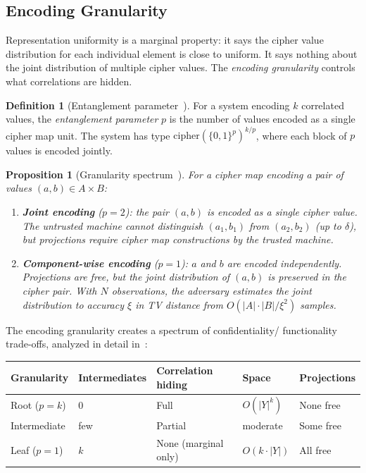 \documentclass[11pt]{article}
\theoremstyle{definition}
\newtheorem{definition}{Definition}[section]
\theoremstyle{plain}
\newtheorem{proposition}[theorem]{Proposition}
\theoremstyle{remark}
\newcommand{\B}{\{0,1\}}
\begin{document}
\subsection{Encoding Granularity}
\label{subsec:granularity}

Representation uniformity is a marginal property: it says the cipher
value distribution for each individual element is close to uniform.  It
says nothing about the joint distribution of multiple cipher
values.  The \emph{encoding granularity} controls what correlations are
hidden.

\begin{definition}[Entanglement parameter~{\cite[Sec.~8]{towell2026cipher}}]
For a system encoding $k$ correlated values, the \emph{entanglement
parameter} $p$ is the number of values encoded as a single cipher map
unit.  The system has type $\mathrm{cipher}(\B^p)^{k/p}$, where each
block of $p$ values is encoded jointly.
\end{definition}

\begin{proposition}[Granularity spectrum~{\cite[Prop.~8.1]{towell2026cipher}}]
\label{prop:granularity}
For a cipher map encoding a pair of values $(a, b) \in A \times B$:
\begin{enumerate}
\item \textbf{Joint encoding} ($p = 2$): the pair $(a, b)$ is encoded as
  a single cipher value.  The untrusted machine cannot distinguish
  $(a_1, b_1)$ from $(a_2, b_2)$ (up to $\delta$), but projections
  require cipher map constructions by the trusted machine.

\item \textbf{Component-wise encoding} ($p = 1$): $a$ and $b$ are
  encoded independently.  Projections are free, but the joint distribution
  of $(a, b)$ is preserved in the cipher pair.  With $N$ observations, the
  adversary estimates the joint distribution to accuracy $\xi$ in TV
  distance from $O(|A| \cdot |B| / \xi^2)$ samples.
\end{enumerate}
\end{proposition}

The encoding granularity creates a spectrum of confidentiality/
functionality trade-offs, analyzed in detail
in~\cite{towell2026algebraic}:

\begin{center}
\begin{tabular}{@{}lllll@{}}
\toprule
Granularity & Intermediates & Correlation hiding & Space & Projections \\
\midrule
Root ($p = k$) & 0 & Full & $O(|Y|^k)$ & None free \\
Intermediate & few & Partial & moderate & Some free \\
Leaf ($p = 1$) & $k$ & None (marginal only) & $O(k \cdot |Y|)$ & All free \\
\bottomrule
\end{tabular}
\end{center}
\end{document}
